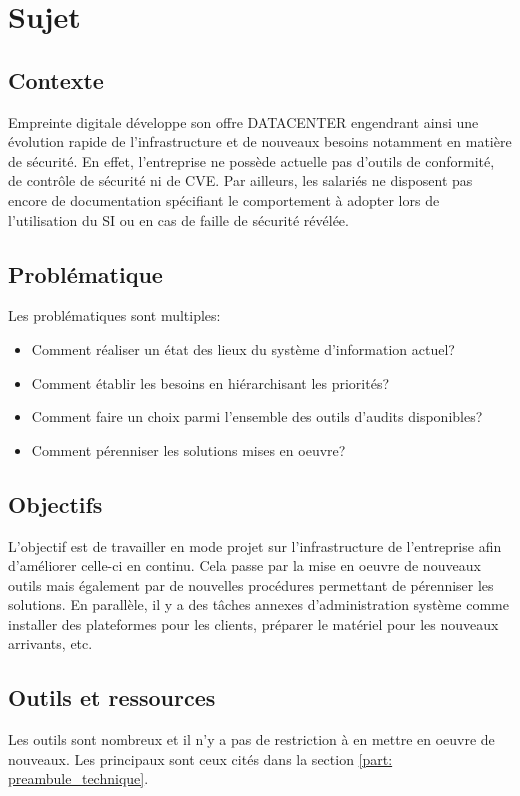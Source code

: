 \documentclass[12pt, a4paper, twoside]{article}
\begin{document}
\newpage
\section{Sujet}
\subsection{Contexte}
Empreinte digitale développe son offre DATACENTER engendrant ainsi une évolution rapide de l'infrastructure et de nouveaux besoins notamment en matière de sécurité. 
En effet, l'entreprise ne possède actuelle pas d'outils de conformité, de contrôle de sécurité ni de \gls{CVE}. 
Par ailleurs, les salariés ne disposent pas encore de documentation spécifiant le comportement à adopter lors de l'utilisation du \gls{SI} ou en cas de faille de sécurité révélée.

\subsection{Problématique}
Les problématiques sont multiples:
\begin{itemize}
    \item Comment réaliser un état des lieux du système d'information actuel?
    \item Comment établir les besoins en hiérarchisant les priorités?
    \item Comment faire un choix parmi l'ensemble des outils d'audits disponibles?
    \item Comment pérenniser les solutions mises en oeuvre? 
\end{itemize}

\subsection{Objectifs}
L'objectif est de travailler en mode projet sur l'infrastructure de l'entreprise afin d'améliorer celle-ci en continu. 
Cela passe par la mise en oeuvre de nouveaux outils mais également par de nouvelles procédures permettant de pérenniser les solutions. 
En parallèle, il y a des tâches annexes d'administration système comme installer des plateformes pour les clients, préparer le matériel pour les nouveaux arrivants, etc.

\subsection{Outils et ressources}
Les outils sont nombreux et il n'y a pas de restriction à en mettre en oeuvre de nouveaux. 
Les principaux sont ceux cités dans la section \ref{part: preambule_technique}.
\end{document}
